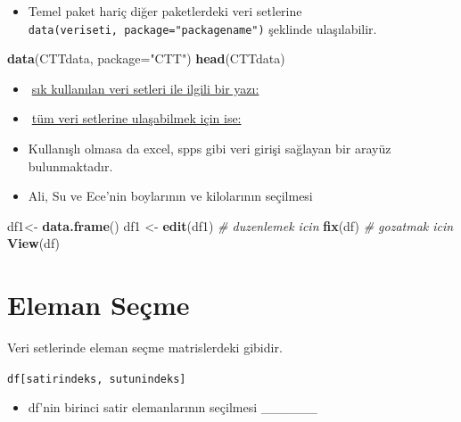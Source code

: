 \documentclass[
  oneside]{book}
\newenvironment{Shaded}{\begin{snugshade}}{\end{snugshade}}
\newcommand{\AttributeTok}[1]{\textcolor[rgb]{0.13,0.29,0.53}{#1}}
\newcommand{\CommentTok}[1]{\textcolor[rgb]{0.56,0.35,0.01}{\textit{#1}}}
\newcommand{\FunctionTok}[1]{\textcolor[rgb]{0.13,0.29,0.53}{\textbf{#1}}}
\newcommand{\NormalTok}[1]{#1}
\newcommand{\OtherTok}[1]{\textcolor[rgb]{0.56,0.35,0.01}{#1}}
\newcommand{\StringTok}[1]{\textcolor[rgb]{0.31,0.60,0.02}{#1}}
\providecommand{\tightlist}{%
  \setlength{\itemsep}{0pt}\setlength{\parskip}{0pt}}
\begin{document}
\begin{itemize}
\tightlist
\item
  Temel paket hariç diğer paketlerdeki veri setlerine \texttt{data(veriseti,\ package="packagename")} şeklinde ulaşılabilir.
\end{itemize}

\begin{Shaded}
\begin{Highlighting}[]
\FunctionTok{data}\NormalTok{(CTTdata, }\AttributeTok{package=}\StringTok{"CTT"}\NormalTok{) }
\FunctionTok{head}\NormalTok{(CTTdata)}
\end{Highlighting}
\end{Shaded}

\begin{itemize}
\item
  🔗\href{http://r-tutorials.com/famous-useful-pre-installed-exercise-datasets-r/}{sık kullanılan veri setleri ile ilgili bir yazı:}
\item
  🔗\href{https://vincentarelbundock.github.io/Rdatasets/datasets.html}{tüm veri setlerine ulaşabilmek için ise:}
\item
  Kullanışlı olmasa da excel, spps gibi veri girişi sağlayan bir arayüz bulunmaktadır.
\item
  Ali, Su ve Ece'nin boylarının ve kilolarının seçilmesi
\end{itemize}

\begin{Shaded}
\begin{Highlighting}[]
\NormalTok{df1}\OtherTok{\textless{}{-}} \FunctionTok{data.frame}\NormalTok{() }
\NormalTok{df1 }\OtherTok{\textless{}{-}} \FunctionTok{edit}\NormalTok{(df1)}
\CommentTok{\# duzenlemek icin}
\FunctionTok{fix}\NormalTok{(df)}
\CommentTok{\# gozatmak icin }
\FunctionTok{View}\NormalTok{(df)}
\end{Highlighting}
\end{Shaded}

\hypertarget{eleman-seuxe7me}{%
\section{Eleman Seçme}\label{eleman-seuxe7me}}

Veri setlerinde eleman seçme matrislerdeki gibidir.

\texttt{df{[}satirindeks,\ sutunindeks{]}}

\begin{itemize}
\tightlist
\item
  df'nin birinci satir elemanlarının seçilmesi \_\_\_\_\_\_
\end{itemize}
\end{document}
